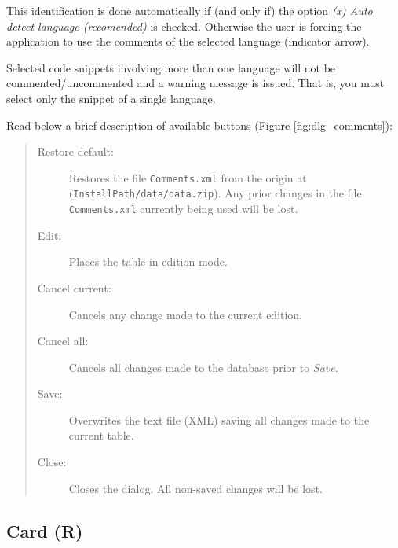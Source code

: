 This identification is done automatically if (and only if) the option
\textit{(x) Auto detect language (recomended)} is checked. Otherwise
the user is forcing the application to use the comments of the selected language
(indicator arrow).

Selected code snippets involving more than one language will not be commented/uncommented
and a warning message is issued. That is, you must select only the snippet of a single language.

Read below a brief description of available buttons (Figure \ref{fig:dlg_comments}):

\begin{quote}
  \begin{footnotesize}
    \begin{description}
      \item[Restore default:]
        Restores the file \texttt{Comments.xml} from the origin at
        (\texttt{InstallPath/data/data.zip}). Any prior changes in the
        file \texttt{Comments.xml} currently being used will be lost.
      \item[Edit:]
        Places the table in edition mode.
      \item[Cancel current:]
        Cancels any change made to the current edition.
      \item[Cancel all:]
        Cancels all changes made to the database prior to \textit{Save}.
      \item[Save:]
        Overwrites the text file (XML) saving all changes made to the current table.
      \item[Close:]
        Closes the dialog. All non-saved changes will be lost.
    \end{description}
  \end{footnotesize}
\end{quote}


\hypertarget{dlg_r_card}{}
\subsection{Card (R)}

